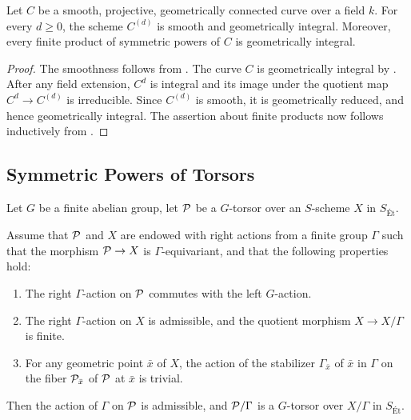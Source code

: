 \begin{cor}\label{cor:symmetric_power_curve_geometry}
Let $C$ be a smooth, projective, geometrically connected curve over a field
$k$. For every $d\geq 0$, the scheme $C^{(d)}$ is smooth and geometrically
integral. Moreover, every finite product of symmetric powers of $C$ is
geometrically integral.
\end{cor}

\begin{proof}
The smoothness follows from .
The curve $C$ is geometrically integral by . After any field
extension, $C^d$ is integral and its image under the quotient map
$C^d\to C^{(d)}$ is irreducible. Since $C^{(d)}$ is smooth, it is geometrically
reduced, and hence geometrically integral. The assertion about finite products
now follows inductively from .
\end{proof}


\subsection*{Symmetric Powers of Torsors}
Let $G$ be a finite abelian group, let $\mathcal{P}$ be a $G$-torsor over an $S$-scheme $X$ in $S_{\text{Ét}}$. 


\begin{prop}
Assume that $\mathcal{P}$ and $X$ are endowed with right actions from a finite group $\Gamma$ 
such that the morphism $\mathcal{P} \to X$ is $\Gamma$-equivariant, and that the following properties hold:
\begin{enumerate}
    \item[(a)] The right $\Gamma$-action on $\mathcal{P}$ commutes with the left $G$-action.
    \item[(b)] The right $\Gamma$-action on $X$ is admissible, and the quotient morphism $X \to X/\Gamma$ is finite.
    \item[(c)] For any geometric point $\bar{x}$ of $X$, the action of the stabilizer $\Gamma_{\bar{x}}$ of $\bar{x}$ in $\Gamma$ on the fiber $\mathcal{P}_{\bar{x}}$ of $\mathcal{P}$ at $\bar{x}$ is trivial.
\end{enumerate}
Then the action of $\Gamma$ on $\mathcal{P}$ is admissible, and $\mathcal{P}/\Gamma$ is a $G$-torsor over $X/\Gamma$ in $S_{\text{Ét}}$.
\end{prop}

